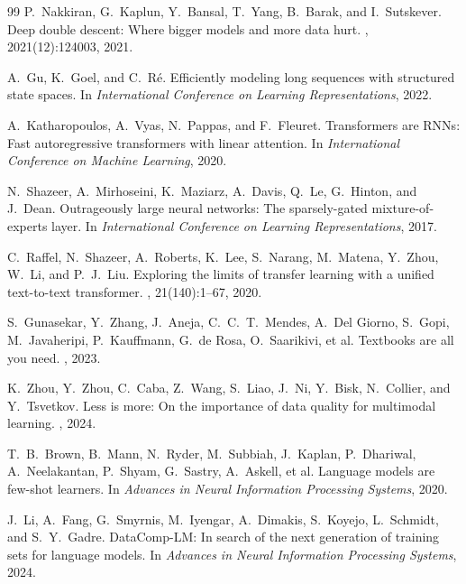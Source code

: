 \documentclass[12pt,a4paper]{article}
\theoremstyle{remark}
\begin{document}
\begin{thebibliography}{99}
P.\ Nakkiran, G.\ Kaplun, Y.\ Bansal, T.\ Yang, B.\ Barak, and I.\ Sutskever.
\newblock Deep double descent: Where bigger models and more data hurt.
, 2021(12):124003, 2021.

A.\ Gu, K.\ Goel, and C.\ R\'{e}.
\newblock Efficiently modeling long sequences with structured state spaces.
\newblock In {\em International Conference on Learning Representations}, 2022.

A.\ Katharopoulos, A.\ Vyas, N.\ Pappas, and F.\ Fleuret.
\newblock Transformers are RNNs: Fast autoregressive transformers with linear attention.
\newblock In {\em International Conference on Machine Learning}, 2020.

N.\ Shazeer, A.\ Mirhoseini, K.\ Maziarz, A.\ Davis, Q.\ Le, G.\ Hinton, and J.\ Dean.
\newblock Outrageously large neural networks: The sparsely-gated mixture-of-experts layer.
\newblock In {\em International Conference on Learning Representations}, 2017.

C.\ Raffel, N.\ Shazeer, A.\ Roberts, K.\ Lee, S.\ Narang, M.\ Matena, Y.\ Zhou, W.\ Li, and P.\ J.\ Liu.
\newblock Exploring the limits of transfer learning with a unified text-to-text transformer.
, 21(140):1--67, 2020.

S.\ Gunasekar, Y.\ Zhang, J.\ Aneja, C.\ C.\ T.\ Mendes, A.\ Del Giorno, S.\ Gopi, M.\ Javaheripi, P.\ Kauffmann, G.\ de Rosa, O.\ Saarikivi, et al.
\newblock Textbooks are all you need.
, 2023.

K.\ Zhou, Y.\ Zhou, C.\ Caba, Z.\ Wang, S.\ Liao, J.\ Ni, Y.\ Bisk, N.\ Collier, and Y.\ Tsvetkov.
\newblock Less is more: On the importance of data quality for multimodal learning.
, 2024.

T.\ B.\ Brown, B.\ Mann, N.\ Ryder, M.\ Subbiah, J.\ Kaplan, P.\ Dhariwal, A.\ Neelakantan, P.\ Shyam, G.\ Sastry, A.\ Askell, et al.
\newblock Language models are few-shot learners.
\newblock In {\em Advances in Neural Information Processing Systems}, 2020.

J.\ Li, A.\ Fang, G.\ Smyrnis, M.\ Iyengar, A.\ Dimakis, S.\ Koyejo, L.\ Schmidt, and S.\ Y.\ Gadre.
\newblock DataComp-LM: In search of the next generation of training sets for language models.
\newblock In {\em Advances in Neural Information Processing Systems}, 2024.


\end{thebibliography}
\end{document}
